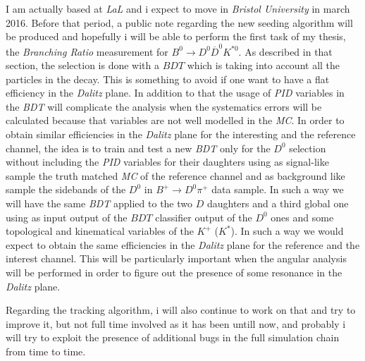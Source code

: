 \documentclass[paper=a4, fontsize=10pt]{scrartcl}
\numberwithin{equation}{section}		%
\numberwithin{figure}{section}			%
\numberwithin{table}{section}				%
\begin{document}
I am actually based at \textit{LaL} and i expect to move in \textit{Bristol University} in march 2016. Before that period, a public note regarding the new seeding algorithm will be produced and hopefully i will be able to perform the first task of my thesis, the \textit{Branching Ratio} measurement for $B^{0}\rightarrow D^{0}\overline{D}^{0}K^{\ast 0}$. As described in that section, the selection is done with a $BDT$ which is taking into account all the particles in the decay. This is something to avoid if one want to have a flat efficiency in the \textit{Dalitz} plane. In addition to that the usage of \textit{PID} variables in the \textit{BDT} will complicate the analysis when the systematics errors will be calculated because that variables are not well modelled in the \textit{MC}. In order to obtain similar efficiencies in the \textit{Dalitz} plane for the interesting and the reference channel, the idea is to train and test a new \textit{BDT} only for the $D^{0}$ selection without including the \textit{PID} variables for their daughters using as signal-like sample the truth matched \textit{MC} of the reference channel and as background like sample the sidebands of the $D^{0}$ in  $B^{+}\rightarrow D^{0} \pi^{+}$ data sample. In such a way we will have the same \textit{BDT} applied to the two $D$ daughters and a third global one using as input output of the $BDT$ classifier output of the $D^{0}$ ones and some topological and kinematical variables of the $K^{+}$ ($K^{\ast}$). In such a way we would expect to obtain the same efficiencies in the \textit{Dalitz} plane for the reference and the interest channel. This will be particularly important when the angular analysis will be performed in order to figure out the presence of some resonance in the \textit{Dalitz} plane.

Regarding the tracking algorithm, i will also continue to work on that and try to improve it, but not full time involved as it has been untill now, and probably i will try to exploit the presence of additional bugs in the full simulation chain from time to time.
\end{document}
